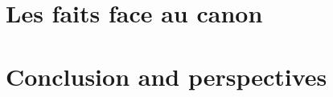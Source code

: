 \documentclass[utf8x]{beamer}
\begin{document}
\section{Les faits face au canon}





\section[Conclusion]{Conclusion and perspectives}

\end{document}

